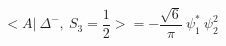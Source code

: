 \begin{equation}
<A|~\Delta^{-},~ S_3=\frac{1}{2} >=- \frac{\sqrt{6}}{\pi} ~\psi_1^*~\psi_2^2
\end{equation}

